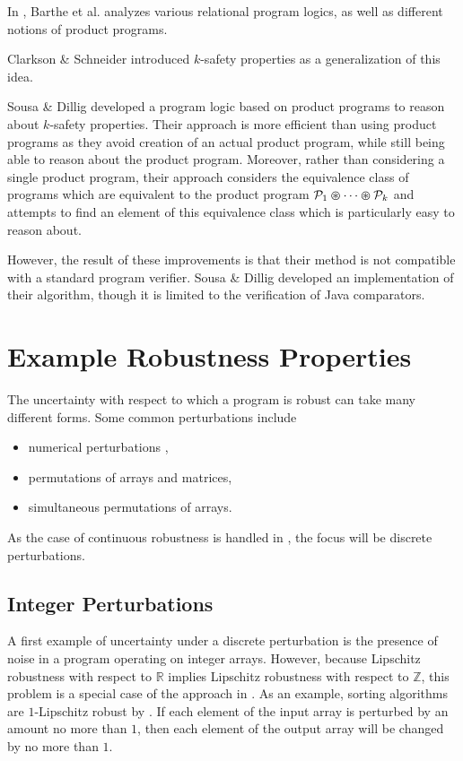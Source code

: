 \documentclass{llncs}
\begin{document}
    In \cite{bartheanalysis}, Barthe et al.
    analyzes various relational program logics, as well as different notions of
    product programs.
    \smallskip

    \space\space Clarkson \& Schneider
    \cite{clarkson08} introduced \(k\)-safety properties as a generalization of this
    idea.

    Sousa \& Dillig \cite{sousa16} developed a program logic based on product programs
    to reason about \(k\)-safety properties.  Their approach is more efficient than
    using product programs as they avoid creation of an actual product program, while
    still being able to reason about the product program.  Moreover, rather than
    considering a single product program, their approach considers the equivalence
    class of programs which are equivalent to the product program
    \(\mathcal{P}_{1} \varoast \dotsb \varoast \mathcal{P}_{k}\) and attempts to
    find an element of this equivalence class which is particularly easy
    to reason about.
    
    However, the result of these improvements is that their method is not compatible
    with a standard program verifier.  Sousa \& Dillig developed
    an implementation of their algorithm, though it is limited to the verification
    of Java comparators.

\section{Example Robustness Properties}

  The uncertainty with respect to which a program is robust can take many
  different forms.  Some common perturbations include
  \begin{itemize}
    \item numerical perturbations \cite{samanta14,chaudhuri10,chaudhuri11},
    \item permutations of arrays and matrices,
    \item simultaneous permutations of arrays.
  \end{itemize}
  As the case of continuous robustness is handled in \cite{chaudhuri10,chaudhuri11},
  the focus will be discrete perturbations.

  \subsection{Integer Perturbations}

  A first example of uncertainty under a discrete perturbation is the presence
  of noise in a program operating on integer arrays.  However, because Lipschitz
  robustness with respect to \(\mathbb{R}\) implies Lipschitz robustness with
  respect to \(\mathbb{Z}\), this problem is a special case of the approach in
  \cite{chaudhuri10,chaudhuri11}.  As an example, sorting algorithms are
  \(1\)-Lipschitz robust by \cite{chaudhuri10,chaudhuri11}.
  If each element of the input array is perturbed by an amount
  no more than \(1\), then each element of the output array will be changed by no
  more than \(1\).
\end{document}
